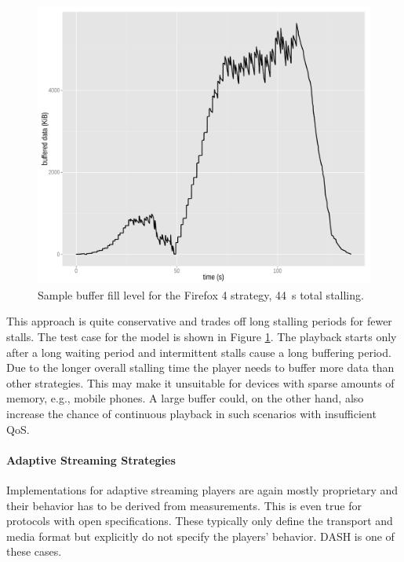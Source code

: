  \begin{figure}[htb]
	\centering
	\includegraphics[width=1.0\textwidth]{images/R-bufferlevel-firefox.pdf}
	\caption{Sample buffer fill level for the Firefox 4 strategy, \SI{44}{\second} total stalling.}
\label{c3:fig:bufferlevel-firefox}
\end{figure}

This approach is quite conservative and trades off long stalling periods for fewer stalls. The test case for the model is shown in Figure \ref{c3:fig:bufferlevel-firefox}. The playback starts only after a long waiting period and intermittent stalls cause a long buffering period. Due to the longer overall stalling time the player needs to buffer more data than other strategies. This may make it unsuitable for devices with sparse amounts of memory, e.g., mobile phones. A large buffer could, on the other hand, also increase the chance of continuous playback in such scenarios with insufficient \gls{QoS}.


\paragraph{Adaptive Streaming Strategies}

Implementations for adaptive streaming players are again mostly proprietary and their behavior has to be derived from measurements. This is even true for protocols with open specifications. These typically only define the transport and media format but explicitly do not specify the players' behavior. \Gls{DASH} is one of these cases.

